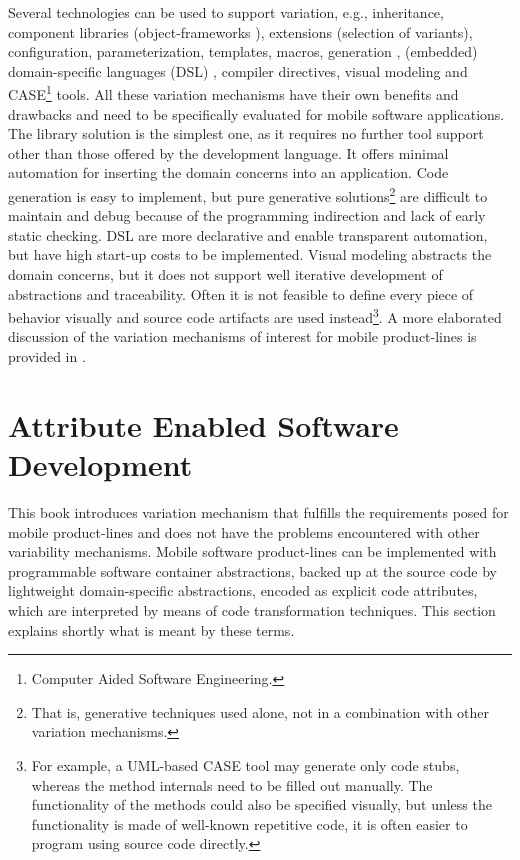 Several technologies \cite{pl.00} can be used to support variation, e.g., inheritance, component libraries (object-frameworks \cite{batoryetal.00}),
extensions (selection of variants), configuration,
parameterization, templates, macros,
generation \cite{generative.00},
(embedded) domain-specific languages (DSL) \cite{deursenetal.00}, compiler directives,
visual modeling and CASE\footnote{Computer Aided Software Engineering.} tools. All these variation mechanisms have their own benefits and drawbacks and need to be specifically evaluated for mobile software applications.
%
The library solution is the simplest one, as it requires no further tool support other than those offered by the development language. It offers minimal automation for inserting the domain concerns into an application. Code generation is easy to implement, but pure generative solutions\footnote{That is, generative techniques used alone, not in a combination with other variation mechanisms.} are difficult to maintain and debug because of the programming indirection and lack of early static checking.
DSL are more declarative and enable transparent automation, but have high start-up costs to be implemented. 
Visual modeling abstracts the domain concerns, but it does not support well iterative development of abstractions and traceability. Often it is not feasible to define every piece of behavior visually and source code artifacts are used instead\footnote{For example, a UML-based CASE tool may generate only code stubs, whereas the method internals need to be filled out manually. The functionality of the methods could also be specified visually, but unless the functionality is made of well-known repetitive code, it is often easier to program using source code directly.}. A more elaborated discussion of the variation mechanisms of interest for mobile product-lines is provided in .

\section{Attribute Enabled Software Development}

This book introduces variation mechanism that fulfills the requirements posed for mobile product-lines and does not have the problems encountered with other variability mechanisms. Mobile software product-lines can be implemented with programmable software container abstractions, backed up at the source code by lightweight domain-specific abstractions, encoded as explicit code attributes, which are interpreted by means of code transformation techniques. This section explains shortly what is meant by these terms.

